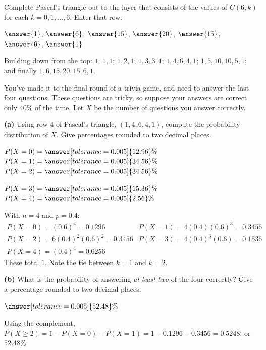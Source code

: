 \documentclass[12pt]{ximera}
\begin{document}
\begin{problem}
Complete Pascal's triangle out to the layer that consists of the values of $C(6,k)$ for
each $k=0,1,\ldots,6$. Enter that row.

$\answer{1}$, $\answer{6}$, $\answer{15}$, $\answer{20}$, $\answer{15}$, $\answer{6}$,
$\answer{1}$

\begin{feedback}
Building down from the top: $1$; $1,1$; $1,2,1$; $1,3,3,1$; $1,4,6,4,1$;
$1,5,10,10,5,1$; and finally $1,6,15,20,15,6,1$.
\end{feedback}
\end{problem}

\begin{problem}
You've made it to the final round of a trivia game, and need to answer the last four
questions. These questions are tricky, so suppose your answers are correct only $40\%$
of the time. Let $X$ be the number of questions you answer correctly.

\begin{prompt}
\textbf{(a)} Using row $4$ of Pascal's triangle, $(1,4,6,4,1)$, compute the
probability distribution of $X$. Give percentages rounded to two decimal places.

$P(X=0)=\answer[tolerance=0.005]{12.96}\%$ \quad
$P(X=1)=\answer[tolerance=0.005]{34.56}\%$ \quad
$P(X=2)=\answer[tolerance=0.005]{34.56}\%$

\smallskip
$P(X=3)=\answer[tolerance=0.005]{15.36}\%$ \quad
$P(X=4)=\answer[tolerance=0.005]{2.56}\%$

\begin{feedback}
With $n=4$ and $p=0.4$:
\[
\begin{array}{ll}
P(X=0)=(0.6)^4=0.1296 & P(X=1)=4(0.4)(0.6)^3=0.3456\\
P(X=2)=6(0.4)^2(0.6)^2=0.3456 & P(X=3)=4(0.4)^3(0.6)=0.1536\\
P(X=4)=(0.4)^4=0.0256 &
\end{array}
\]
These total $1$. Note the tie between $k=1$ and $k=2$.
\end{feedback}
\end{prompt}

\begin{prompt}
\textbf{(b)} What is the probability of answering \emph{at least two} of the four
correctly? Give a percentage rounded to two decimal places.

$\answer[tolerance=0.005]{52.48}\%$

\begin{feedback}
Using the complement,
$P(X\ge 2)=1-P(X=0)-P(X=1)=1-0.1296-0.3456=0.5248$, or $52.48\%$.
\end{feedback}
\end{prompt}
\end{problem}
\end{document}
